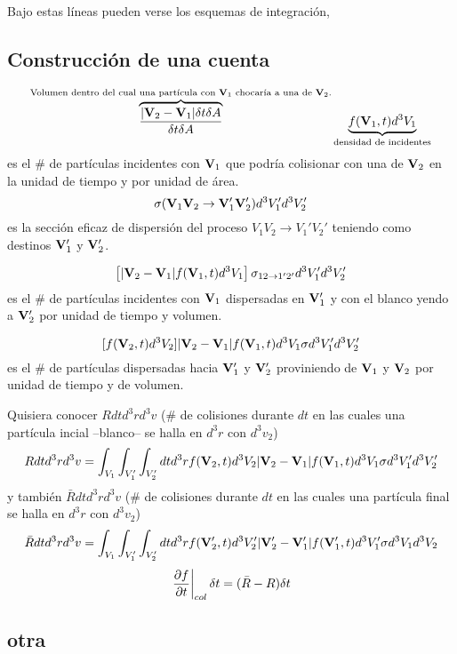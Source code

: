 \documentclass[10pt,oneside]{CBFT_book}
\begin{document}
Bajo estas líneas pueden verse los esquemas de integración,


\subsection{Construcción de una cuenta}

\[
	\overbrace{\frac{|\vb{V}_2-\vb{V}_1|\delta t \delta A}{\delta t \delta A}}^{\text{Volumen dentro
	del cual una partícula con $\vb{V}_1$ chocaría a una de $\vb{V}_2$.}}
	\underbrace{f(\vb{V}_1,t) d^3V_1}_{\text{densidad de incidentes}}
\]
es el \# de partículas incidentes con $\vb{V}_1$ que podría colisionar con una de $\vb{V}_2$ en la unidad
de tiempo y por unidad de área.
\[
	\sigma (\vb{V}_1\vb{V}_2 \to \vb{V}_1' \vb{V}_2') d^3V_1' d^3V_2'
\]
es la sección eficaz de dispersión del proceso $V_1V_2 \to V_1'V_2'$ teniendo como destinos $\vb{V}_1'$ y
$\vb{V}_2'$.

\[
	\left[ |\vb{V}_2-\vb{V}_1| f(\vb{V}_1,t) d^3V_1 \right] \sigma_{ 12 \to 1'2'} d^3V_1' d^3V_2'
\]
es el \# de partículas incidentes con $\vb{V}_1$ dispersadas en $\vb{V}_1'$ y con el blanco yendo a $\vb{V}_2'$
por unidad de tiempo y volumen.

\[
	[ f(\vb{V}_2,t) d^3V_2 ] |\vb{V}_2-\vb{V}_1| f(\vb{V}_1,t) d^3V_1 \sigma d^3V_1' d^3V_2'
\]
es el \# de partículas dispersadas hacia $\vb{V}_1'$ y $\vb{V}_2'$ proviniendo de $\vb{V}_1$ y $\vb{V}_2$ por 
unidad de tiempo y de volumen.

Quisiera conocer $R dt d^3r d^3v$ (\# de colisiones durante $dt$ en las cuales una partícula incial --blanco-- se
halla en $d^3r$ con $d^3v_2$)
\[
	R dt d^3r d^3v = \int_{V_1}\int_{V_1'}\int_{V_2'} dt d^3r 
	f(\vb{V}_2,t) d^3V_2 |\vb{V}_2-\vb{V}_1| f(\vb{V}_1,t) d^3V_1 \sigma d^3V_1' d^3V_2'
\]
y también $\bar{R} dt d^3r d^3v$ (\# de colisiones durante $dt$ en las cuales una partícula final se halla en 
$d^3r$ con $d^3v_2$)
\[
	\bar{R} dt d^3r d^3v = \int_{V_1}\int_{V_1'}\int_{V_2'} dt d^3r 
	f(\vb{V}_2',t) d^3V_2' |\vb{V}_2'-\vb{V}_1'| f(\vb{V}_1',t) d^3V_1' \sigma d^3V_1 d^3V_2
\]
\[
	\left. \frac{\partial^{\hspace{-0.05em}} {f}}{\partial {t}^{\hspace{-0.05em}}}\right|_{col} \delta t = (\bar{R} - R)\delta t
\]


\subsection{otra}
\end{document}
